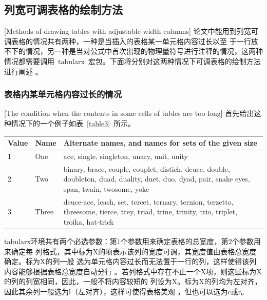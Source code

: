 \subsection{列宽可调表格的绘制方法}[Methods of drawing tables with adjustable-width columns]
论文中能用到列宽可调表格的情况共有两种，一种是当插入的表格某一单元格内容过长以至
于一行放不下的情况，另一种是当对公式中首次出现的物理量符号进行注释的情况，这两种
情况都需要调用~tabularx~宏包。下面将分别对这两种情况下可调表格的绘制方法进行阐述
。
\subsubsection{表格内某单元格内容过长的情况}[The condition when the contents in
  some cells of tables are too long]
首先给出这种情况下的一个例子如表~\ref{table3}~所示。
\begin{table}[htbp]
  \centering
  \vspace{0.5em}\wuhao
  \begin{tabularx}{0.7\textwidth}{llX}
    \toprule[1.5pt]
    Value & Name  & Alternate names, and names for sets of the given size                                                                                           \\\midrule[1pt]
    1     & One   & ace, single, singleton, unary, unit, unity                                                                                                      \\
    2     & Two   & binary, brace, couple, couplet, distich, deuce, double, doubleton, duad, duality, duet, duo, dyad, pair, snake eyes, span, twain, twosome, yoke \\
    3     & Three & deuce-ace, leash, set, tercet, ternary, ternion, terzetto, threesome, tierce, trey, triad, trine, trinity, trio, triplet, troika, hat-trick     \\\bottomrule[1.5pt]
  \end{tabularx}
\end{table}
tabularx环境共有两个必选参数：第1个参数用来确定表格的总宽度，第2个参数用来确定每
列格式，其中标为X的项表示该列的宽度可调，其宽度值由表格总宽度确定。标为X的列一般
选为单元格内容过长而无法置于一行的列，这样使得该列内容能够根据表格总宽度自动分行
。若列格式中存在不止一个X项，则这些标为X的列的列宽相同，因此，一般不将内容较短的
列设为X。标为X的列均为左对齐，因此其余列一般选为l（左对齐），这样可使得表格美观
，但也可以选为c或r。

